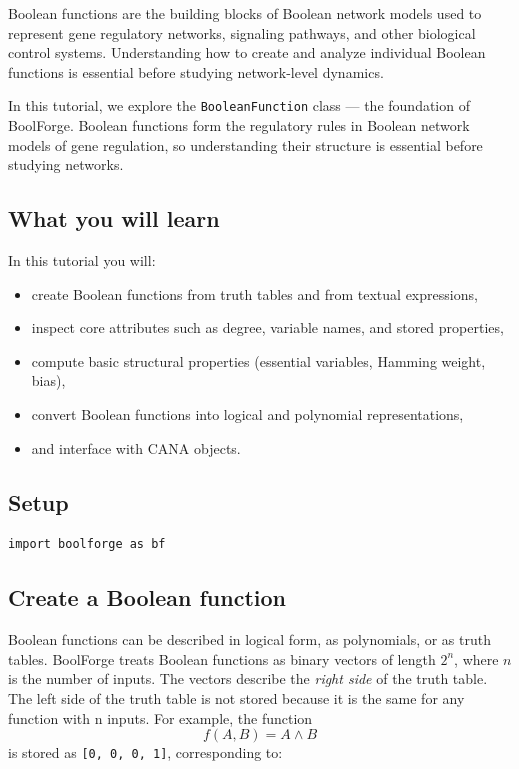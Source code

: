 \documentclass[
]{article}
\providecommand{\tightlist}{%
  \setlength{\itemsep}{0pt}\setlength{\parskip}{0pt}}
\begin{document}
Boolean functions are the building blocks of Boolean network models used
to represent gene regulatory networks, signaling pathways, and other
biological control systems. Understanding how to create and analyze
individual Boolean functions is essential before studying network-level
dynamics.

In this tutorial, we explore the \texttt{BooleanFunction} class --- the
foundation of BoolForge. Boolean functions form the regulatory rules in
Boolean network models of gene regulation, so understanding their
structure is essential before studying networks.

\subsection{What you will learn}\label{what-you-will-learn}

In this tutorial you will:

\begin{itemize}
\tightlist
\item
  create Boolean functions from truth tables and from textual
  expressions,
\item
  inspect core attributes such as degree, variable names, and stored
  properties,
\item
  compute basic structural properties (essential variables, Hamming
  weight, bias),
\item
  convert Boolean functions into logical and polynomial representations,
\item
  and interface with CANA objects.
\end{itemize}

\subsection{Setup}\label{setup}

\begin{lstlisting}
import boolforge as bf
\end{lstlisting}

\subsection{Create a Boolean function}\label{create-a-boolean-function}

Boolean functions can be described in logical form, as polynomials, or
as truth tables. BoolForge treats Boolean functions as binary vectors of
length \(2^n\), where \(n\) is the number of inputs. The vectors
describe the \emph{right side} of the truth table. The left side of the
truth table is not stored because it is the same for any function with n
inputs. For example, the function \[
f(A,B) = A \land B
\] is stored as \texttt{{[}0,\ 0,\ 0,\ 1{]}}, corresponding to:
\end{document}
